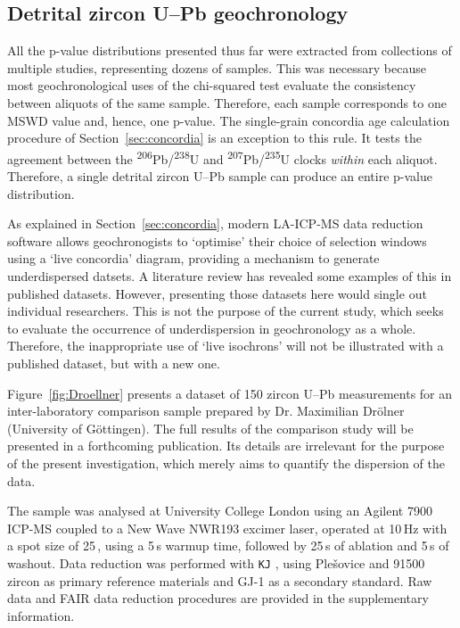 \documentclass{article}
\begin{document}
\subsection{Detrital zircon U--Pb geochronology}\label{sec:detrital}

All the p-value distributions presented thus far were extracted from
collections of multiple studies, representing dozens of samples. This
was necessary because most geochronological uses of the chi-squared
test evaluate the consistency between aliquots of the same
sample. Therefore, each sample corresponds to one MSWD value and,
hence, one p-value.  The single-grain concordia age calculation
procedure of Section~\ref{sec:concordia} is an exception to this rule.
It tests the agreement between the
\textsuperscript{206}Pb/\textsuperscript{238}U and
\textsuperscript{207}Pb/\textsuperscript{235}U clocks \emph{within}
each aliquot. Therefore, a single detrital zircon U--Pb sample can
produce an entire p-value distribution.\medskip

As explained in Section~\ref{sec:concordia}, modern LA-ICP-MS data
reduction software allows geochronogists to `optimise' their choice of
selection windows using a `live concordia' diagram, providing a
mechanism to generate underdispersed datsets. A literature review has
revealed some examples of this in published datasets. However,
presenting those datasets here would single out individual
researchers. This is not the purpose of the current study, which seeks
to evaluate the occurrence of underdispersion in geochronology as a
whole. Therefore, the inappropriate use of `live isochrons' will not
be illustrated with a published dataset, but with a new one.\medskip

Figure~\ref{fig:Droellner} presents a dataset of 150 zircon U--Pb
measurements for an inter-laboratory comparison sample prepared by
Dr. Maximilian Dr\"{o}lner (University of G\"{o}ttingen). The full
results of the comparison study will be presented in a forthcoming
publication. Its details are irrelevant for the purpose of the present
investigation, which merely aims to quantify the dispersion of the
data.\medskip

The sample was analysed at University College London using an Agilent
7900 ICP-MS coupled to a New Wave NWR193 excimer laser, operated at
10\,Hz with a spot size of 25\,, using a 5\,s warmup time,
followed by 25\,s of ablation and 5\,s of washout.  Data reduction was
performed with \texttt{KJ} \citep{vermeesch2026b}, using
Ple{\v{s}}ovice and 91500 zircon \citep{slama2008,wiedenbeck1995} as 
primary reference materials and GJ-1 \citep{jackson2004} as a
secondary standard. Raw data and FAIR data reduction procedures are
provided in the supplementary information.\medskip
\end{document}
